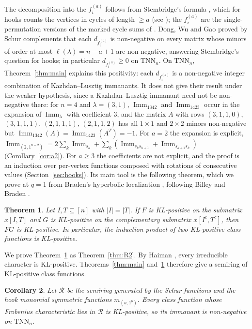 \documentclass[11pt]{amsart}
\newtheorem{theorem}{Theorem}[section]
\newtheorem{corollary}[theorem]{Corollary}
\theoremstyle{definition}
\theoremstyle{remark}
\newcommand{\Imm}{\operatorname{Imm}}
\newcommand{\TNN}{\mathrm{TNN}}
\begin{document}
The decomposition into the $f^{(a)}_i$ follows from Stembridge's formula \cite[Prop.~1.1]{Ste92}, which for hooks counts the vertices in cycles of length $\ge a$ (see \cite[Lemma~2.1]{DWG}); the $f^{(a)}_i$ are the single-permutation versions of the marked cycle sums of \cite[Def.~2.2]{DWG}. Dong, Wu and Gao \cite[proof of Thm.~1.2, \S2.5]{DWG} proved by Schur complements that each $d_{f^{(a)}_i}$ is non-negative on every matrix whose minors of order at most $\ell(\lambda)=n-a+1$ are non-negative, answering Stembridge's question \cite[Question~2.9]{Ste92} for hooks; in particular $d_{f^{(a)}_i}\ge0$ on $\TNN_n$. On $\TNN_n$, Theorem~\ref{thm:main} explains this positivity: each $d_{f^{(a)}_i}$ is a non-negative integer combination of Kazhdan--Lusztig immanants. It does not give their result under the weaker hypothesis, since a Kazhdan--Lusztig immanant need not be non-negative there: for $n=4$ and $\lambda=(3,1)$, $\Imm_{1342}$ and $\Imm_{1423}$ occur in the expansion of $\Imm_\lambda$ with coefficient $3$, and the matrix $A$ with rows $(3,1,1,0)$, $(3,1,1,1)$, $(2,1,1,1)$, $(2,1,1,2)$ has all $1\times1$ and $2\times2$ minors non-negative but $\Imm_{1342}(A)=\Imm_{1423}(A^T)=-1$. For $a=2$ the expansion is explicit, $\Imm_{(2,1^{n-2})}=2\sum_k\Imm_{s_k}+\sum_k(\Imm_{s_ks_{k+1}}+\Imm_{s_{k+1}s_k})$ (Corollary~\ref{cor:a2}). For $a\ge3$ the coefficients are not explicit, and the proof is an induction over per-vertex functions composed with rotations of consecutive values (Section~\ref{sec:hooks}). Its main tool is the following theorem, which we prove at $q=1$ from Braden's hyperbolic localization \cite{Bra03}, following Billey and Braden \cite{BB03}.

\begin{theorem}\label{thm:prod}
Let $I,T\subseteq[n]$ with $|I|=|T|$. If $F$ is KL-positive on the submatrix $x[I,T]$ and $G$ is KL-positive on the complementary submatrix $x[I^c,T^c]$, then $FG$ is KL-positive. In particular, the induction product of two KL-positive class functions is KL-positive.
\end{theorem}

We prove Theorem~\ref{thm:prod} as Theorem~\ref{thm:R2}. By Haiman \cite[Lemma~1.1]{Hai}, every irreducible character is KL-positive. Theorems~\ref{thm:main} and~\ref{thm:prod} therefore give a semiring of KL-positive class functions.

\begin{corollary}\label{cor:semiring}
Let $\mathcal R$ be the semiring generated by the Schur functions and the hook monomial symmetric functions $m_{(a,1^b)}$. Every class function whose Frobenius characteristic lies in $\mathcal R$ is KL-positive, so its immanant is non-negative on $\TNN_n$.
\end{corollary}
\end{document}
